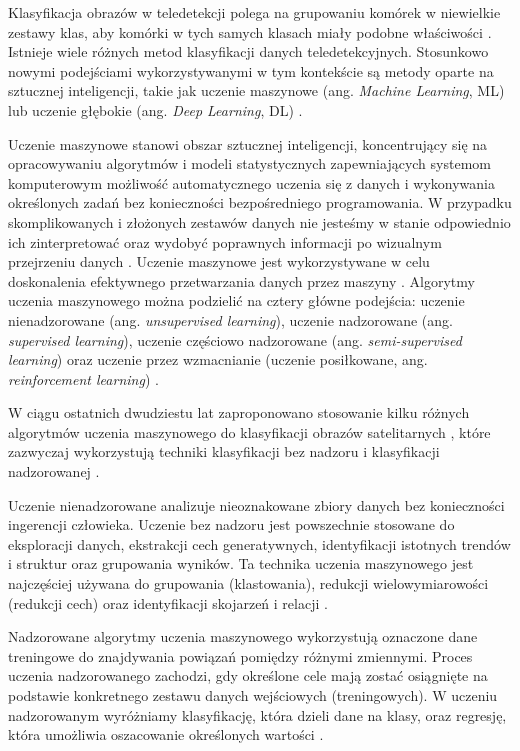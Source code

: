 \documentclass{amuthesis}
\begin{document}
Klasyfikacja obrazów w teledetekcji polega na grupowaniu komórek w
niewielkie zestawy klas, aby komórki w tych samych klasach miały podobne
właściwości \autocite{ismail_2009_classification}. Istnieje wiele
różnych metod klasyfikacji danych teledetekcyjnych. Stosunkowo nowymi
podejściami wykorzystywanymi w tym kontekście są metody oparte na
sztucznej inteligencji, takie jak uczenie maszynowe (ang. \emph{Machine
Learning}, ML) lub uczenie głębokie (ang. \emph{Deep Learning}, DL)
\autocite{hejmanowska_2020_dane}.

Uczenie maszynowe stanowi obszar sztucznej inteligencji, koncentrujący
się na opracowywaniu algorytmów i modeli statystycznych zapewniających
systemom komputerowym możliwość automatycznego uczenia się z danych i
wykonywania określonych zadań bez konieczności bezpośredniego
programowania. W przypadku skomplikowanych i złożonych zestawów danych
nie jesteśmy w stanie odpowiednio ich zinterpretować oraz wydobyć
poprawnych informacji po wizualnym przejrzeniu danych
\autocite{mahesh_2019_ml}. Uczenie maszynowe jest wykorzystywane w celu
doskonalenia efektywnego przetwarzania danych przez maszyny
\autocite{sindayigaya_2022_ml}. Algorytmy uczenia maszynowego można
podzielić na cztery główne podejścia: uczenie nienadzorowane (ang.
\emph{unsupervised learning}), uczenie nadzorowane (ang.
\emph{supervised learning}), uczenie częściowo nadzorowane (ang.
\emph{semi-supervised learning}) oraz uczenie przez wzmacnianie (uczenie
posiłkowane, ang. \emph{reinforcement learning})
\autocite{sarker_2021_ml}.

W ciągu ostatnich dwudziestu lat zaproponowano stosowanie kilku różnych
algorytmów uczenia maszynowego do klasyfikacji obrazów satelitarnych
\autocite{sheykhmousa_2020_svm_vs_rf}, które zazwyczaj wykorzystują
techniki klasyfikacji bez nadzoru i klasyfikacji nadzorowanej
\autocite{ismail_2009_classification}.

Uczenie nienadzorowane analizuje nieoznakowane zbiory danych bez
konieczności ingerencji człowieka. Uczenie bez nadzoru jest powszechnie
stosowane do eksploracji danych, ekstrakcji cech generatywnych,
identyfikacji istotnych trendów i struktur oraz grupowania wyników. Ta
technika uczenia maszynowego jest najczęściej używana do grupowania
(klastowania), redukcji wielowymiarowości (redukcji cech) oraz
identyfikacji skojarzeń i relacji \autocite{sarker_2021_ml}.

Nadzorowane algorytmy uczenia maszynowego wykorzystują oznaczone dane
treningowe do znajdywania powiązań pomiędzy różnymi zmiennymi. Proces
uczenia nadzorowanego zachodzi, gdy określone cele mają zostać
osiągnięte na podstawie konkretnego zestawu danych wejściowych
(treningowych). W uczeniu nadzorowanym wyróżniamy klasyfikację, która
dzieli dane na klasy, oraz regresję, która umożliwia oszacowanie
określonych wartości \autocite{sarker_2021_ml}.
\end{document}
